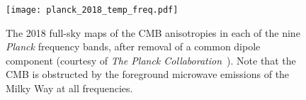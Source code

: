 \begin{figure}[htpb]
	\centering\capstart{}
	\texttt{[image: planck\_2018\_temp\_freq.pdf]}
	\caption[
		The 2018 \emph{Planck} maps in intensity, from \(\SIrange{30}{857}{\giga\hertz}\)
	]{
		The 2018 full-sky maps of the CMB anisotropies in each of the nine \emph{Planck} frequency bands, after removal of a common dipole component (courtesy of \emph{The Planck Collaboration}~\cite{Planck2020}).
		Note that the CMB is obstructed by the foreground microwave emissions of the Milky Way at all frequencies.
	}\label{fig:chapter2_planck_frequency}
\end{figure}
